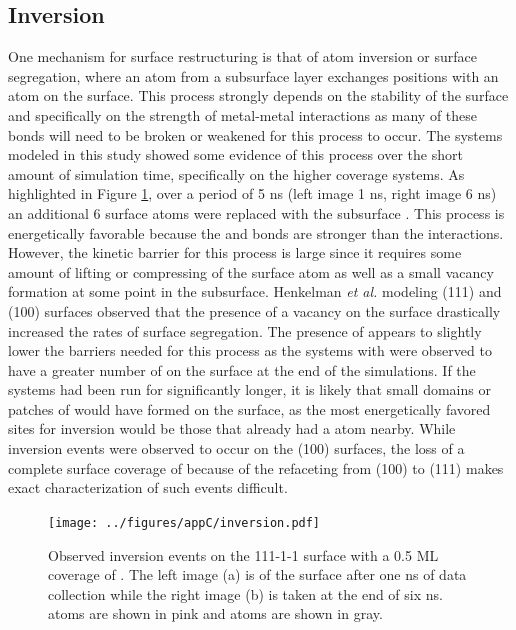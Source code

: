 \subsection{Inversion}
One mechanism for surface restructuring is that of atom inversion or surface
segregation, where an atom from a subsurface layer exchanges positions with an
atom on the surface.  This process strongly depends on the stability of the
surface and specifically on  the strength of metal-metal interactions as many
of these bonds will need to be broken or weakened for this process to occur.
The  systems modeled in this study showed some evidence of this
process over the short amount of simulation time, specifically on the higher
 coverage systems. As highlighted in Figure \ref{fig:inversion}, over a
period of 5 ns (left image 1 ns, right image 6 ns) an additional 6 
surface atoms were replaced with the subsurface .  This process is
energetically favorable because the  and 
bonds are stronger than the  interactions.  However, the
kinetic barrier for this process is large since it requires some amount of
lifting or compressing of the surface atom as well as a small vacancy formation
at some point in the subsurface. Henkelman {\em et al.} modeling (111) and
(100)  surfaces observed that the presence of a vacancy on the surface
drastically increased the rates of surface segregation.\citep{Kim:2013mi} The
presence of  appears to slightly lower the barriers needed for this
process as the systems with  were observed to have a greater number of
 on the surface at the end of the simulations. If the systems had been
run for significantly longer, it is likely that small domains or patches of
 would have formed on the surface, as the most energetically favored
sites for inversion would be those that already had a  atom nearby.
While inversion events were observed to occur on the (100) surfaces, the loss
of a complete surface coverage of  because of the refaceting from (100)
to (111) makes exact characterization of such events difficult.


\begin{figure}[p!]
\centering
\texttt{[image: ../figures/appC/inversion.pdf]}
\caption{Observed inversion events on the 111-1-1 surface with a
0.5 ML coverage of . The left image (a) is of the surface after one ns
of data collection while the right image (b) is taken at the end of six ns.
 atoms are shown in pink and  atoms are shown in gray.}
\label{fig:inversion}
\end{figure}

